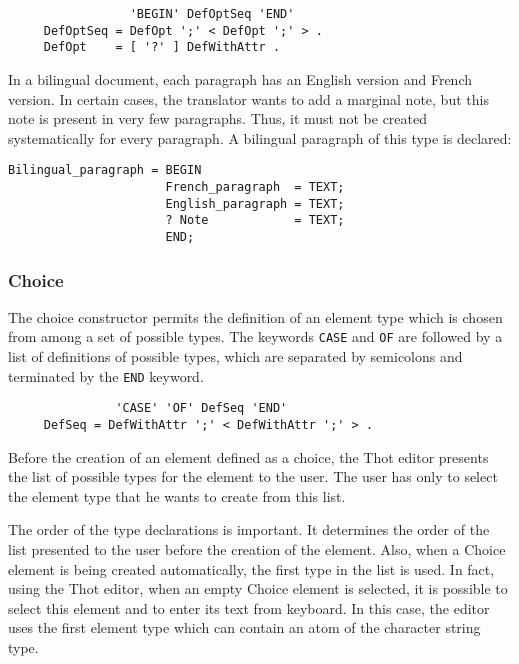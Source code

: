 \begin{verbatim}
                 'BEGIN' DefOptSeq 'END'
     DefOptSeq = DefOpt ';' < DefOpt ';' > .
     DefOpt    = [ '?' ] DefWithAttr .
\end{verbatim}

\begin{example}
In a bilingual document, each paragraph has an English version and
French version.  In certain cases, the translator wants to add a
marginal note, but this note is present in very few paragraphs.  Thus,
it must not be created systematically for every paragraph.  A
bilingual paragraph of this type is declared:

\begin{verbatim}
Bilingual_paragraph = BEGIN
                      French_paragraph  = TEXT;
                      English_paragraph = TEXT;
                      ? Note            = TEXT;
                      END;
\end{verbatim}
\end{example}

\subsubsection{Choice}

The choice constructor permits the definition of an element type which
is chosen from among a set of possible types.  The keywords {\tt CASE}
and {\tt OF} are followed by a list of definitions of possible types,
which are separated by semicolons and terminated by the {\tt END} keyword.

\begin{verbatim}
               'CASE' 'OF' DefSeq 'END'
     DefSeq = DefWithAttr ';' < DefWithAttr ';' > .
\end{verbatim}

Before the creation of an element defined as a choice, the Thot editor
presents the list of possible types for the element to the user.  The
user has only to select the element type that he wants to create from
this list.

The order of the type declarations is important.  It
determines the order of the list presented to the user before the
creation of the element.  Also, when a Choice element is being created
automatically, the first type in the list is used.  In fact, using the
Thot editor, when an empty Choice element is selected,
it is possible to select this element and to enter its text from keyboard.
In this case, the editor uses the first element type which can contain
an atom of the character string type.

